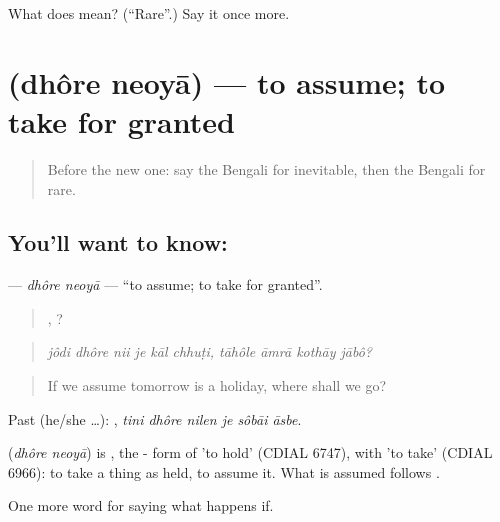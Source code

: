 \begin{tcolorbox}[breakable,colback=teal!4,colframe=teal!35!black,title={Before you move on}]
What does  mean? (\textquotedblleft{}Rare\textquotedblright{}.) Say it once more.
\end{tcolorbox}
\section[\texorpdfstring{\bn{ধরে} \bn{নেওয়া} (dhôre neoyā)}{ধরে নেওয়া (dhôre neoyā)}]{  (dhôre neoyā) — to assume; to take for granted}

\label{lesson:BN-C366-dhore-neoya}



\begin{quote}
Before the new one: say the Bengali for inevitable, then the Bengali for rare.
\end{quote}

\subsection*{You'll want to know:  }
\textbf{ } — \emph{dhôre neoyā} — \textquotedblleft{}to assume; to take for granted\textquotedblright{}.

\begin{quote}
     ,    ?
\end{quote}

\begin{quote}
\emph{jôdi dhôre nii je kāl chhuṭi, tāhôle āmrā kothāy jābô?}
\end{quote}

\begin{quote}
If we assume tomorrow is a holiday, where shall we go?
\end{quote}

Past (he/she …):      , \emph{tini dhôre nilen je sôbāi āsbe}.

\begin{cousinweb}
\textbf{ } (\emph{dhôre neoyā}) is , the - form of  'to hold' (CDIAL 6747), with  'to take' (CDIAL 6966): to take a thing as held, to assume it. What is assumed follows .
\end{cousinweb}

\begin{grammarlens}[title={What you've built}]
One more word for saying what happens if.
\end{grammarlens}

